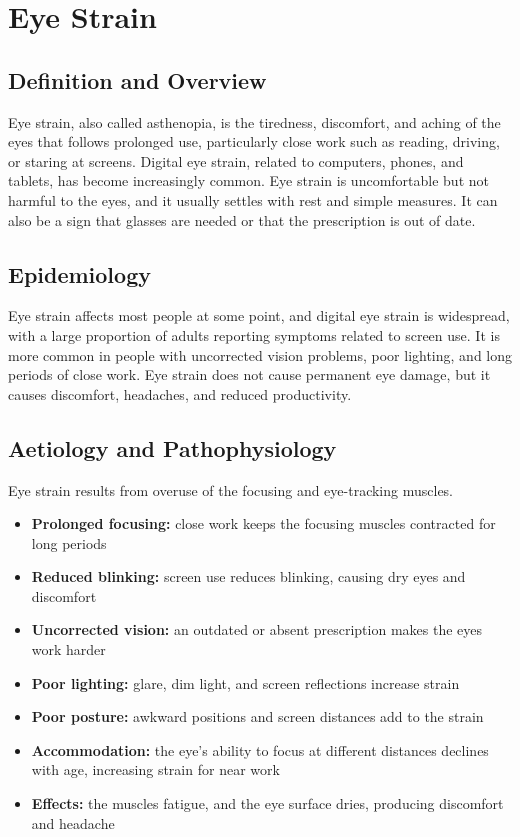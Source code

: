 \chapter{Eye Strain}

\section*{Definition and Overview}
Eye strain, also called asthenopia, is the tiredness, discomfort, and aching of the eyes that follows prolonged use, particularly close work such as reading, driving, or staring at screens. Digital eye strain, related to computers, phones, and tablets, has become increasingly common. Eye strain is uncomfortable but not harmful to the eyes, and it usually settles with rest and simple measures. It can also be a sign that glasses are needed or that the prescription is out of date.

\section*{Epidemiology}
Eye strain affects most people at some point, and digital eye strain is widespread, with a large proportion of adults reporting symptoms related to screen use. It is more common in people with uncorrected vision problems, poor lighting, and long periods of close work. Eye strain does not cause permanent eye damage, but it causes discomfort, headaches, and reduced productivity.

\section*{Aetiology and Pathophysiology}
Eye strain results from overuse of the focusing and eye-tracking muscles.
\begin{itemize}
    \item \textbf{Prolonged focusing:} close work keeps the focusing muscles contracted for long periods
    \item \textbf{Reduced blinking:} screen use reduces blinking, causing dry eyes and discomfort
    \item \textbf{Uncorrected vision:} an outdated or absent prescription makes the eyes work harder
    \item \textbf{Poor lighting:} glare, dim light, and screen reflections increase strain
    \item \textbf{Poor posture:} awkward positions and screen distances add to the strain
    \item \textbf{Accommodation:} the eye's ability to focus at different distances declines with age, increasing strain for near work
    \item \textbf{Effects:} the muscles fatigue, and the eye surface dries, producing discomfort and headache
\end{itemize}

